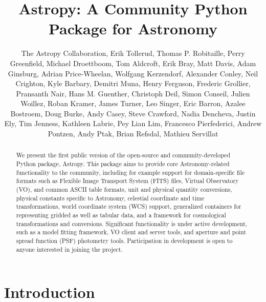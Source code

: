 \documentclass[12pt,preprint]{aastex}
\begin{document}
\title{Astropy: A Community Python Package for Astronomy}



\author{
The Astropy Collaboration,
Erik Tollerud,
Thomas P. Robitaille,
Perry Greenfield,
Michael Droettboom,
Tom Aldcroft,
Erik Bray,
Matt Davis,
Adam Ginsburg,
Adrian Price-Wheelan,
Wolfgang Kerzendorf,
Alexander Conley,
Neil Crighton,
Kyle Barbary,
Demitri Muna,
Henry Ferguson,
Frederic Grollier,
Pransanth Nair,
Hans M. Guenther,
Christoph Deil,
Simon Conseil,
Julien Woillez,
Roban Kramer,
James Turner,
Leo Singer,
Eric Barron,
Azalee Bostroem,
Doug Burke,
Andy Casey,
Steve Crawford,
Nadia Dencheva,
Justin Ely,
Tim Jenness,
Kathleen Labrie,
Pey Lian Lim,
Francesco Pierfederici,
Andrew Pontzen,
Andy Ptak,
Brian Refsdal,
Mathieu Servillat
}

\begin{abstract}
We present the first public version of the open-source and community-developed
Python package, Astropy. This package aims to provide core Astronomy-related
functionality to the community, including for example support for
domain-specific file formats such as Flexible Image Transport System (FITS)
files, Virtual Observatory (VO), and common ASCII table formats, unit and
physical quantity conversions, physical constants specific to Astronomy,
celestial coordinate and time transformations, world coordinate system (WCS)
support, generalized containers for representing gridded as well as tabular
data, and a framework for cosmological transformations and conversions.
Significant functionality is under active development, such as a model fitting
framework, VO client and server tools, and aperture and point spread function
(PSF) photometry tools. Participation in development is open to anyone
interested in joining the project.
\end{abstract}

\tableofcontents


\section{Introduction}
\end{document}
